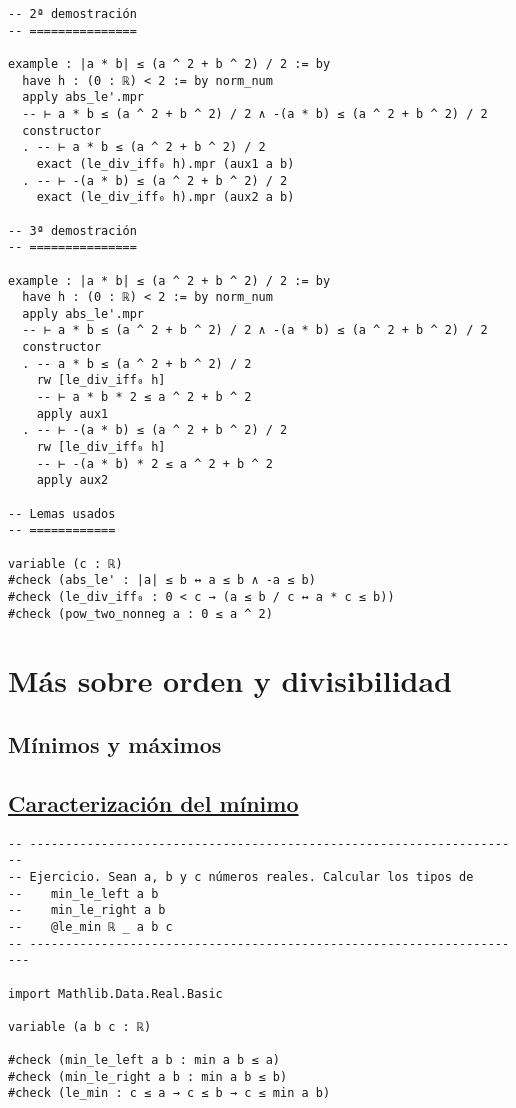 \begin{verbatim}
-- 2ª demostración
-- ===============

example : |a * b| ≤ (a ^ 2 + b ^ 2) / 2 := by
  have h : (0 : ℝ) < 2 := by norm_num
  apply abs_le'.mpr
  -- ⊢ a * b ≤ (a ^ 2 + b ^ 2) / 2 ∧ -(a * b) ≤ (a ^ 2 + b ^ 2) / 2
  constructor
  . -- ⊢ a * b ≤ (a ^ 2 + b ^ 2) / 2
    exact (le_div_iff₀ h).mpr (aux1 a b)
  . -- ⊢ -(a * b) ≤ (a ^ 2 + b ^ 2) / 2
    exact (le_div_iff₀ h).mpr (aux2 a b)

-- 3ª demostración
-- ===============

example : |a * b| ≤ (a ^ 2 + b ^ 2) / 2 := by
  have h : (0 : ℝ) < 2 := by norm_num
  apply abs_le'.mpr
  -- ⊢ a * b ≤ (a ^ 2 + b ^ 2) / 2 ∧ -(a * b) ≤ (a ^ 2 + b ^ 2) / 2
  constructor
  . -- a * b ≤ (a ^ 2 + b ^ 2) / 2
    rw [le_div_iff₀ h]
    -- ⊢ a * b * 2 ≤ a ^ 2 + b ^ 2
    apply aux1
  . -- ⊢ -(a * b) ≤ (a ^ 2 + b ^ 2) / 2
    rw [le_div_iff₀ h]
    -- ⊢ -(a * b) * 2 ≤ a ^ 2 + b ^ 2
    apply aux2

-- Lemas usados
-- ============

variable (c : ℝ)
#check (abs_le' : |a| ≤ b ↔ a ≤ b ∧ -a ≤ b)
#check (le_div_iff₀ : 0 < c → (a ≤ b / c ↔ a * c ≤ b))
#check (pow_two_nonneg a : 0 ≤ a ^ 2)
\end{verbatim}

\section{Más sobre orden y divisibilidad}
\label{sec:orgea8a7f8}

\subsection{Mínimos y máximos}
\label{sec:org8b47379}

\subsection{\href{./src/Basicos/Caracterizacion\_del\_minimo.lean}{Caracterización del mínimo}}
\label{sec:orgf97c818}
\begin{verbatim}
-- ---------------------------------------------------------------------
-- Ejercicio. Sean a, b y c números reales. Calcular los tipos de
--    min_le_left a b
--    min_le_right a b
--    @le_min ℝ _ a b c
-- ----------------------------------------------------------------------

import Mathlib.Data.Real.Basic

variable (a b c : ℝ)

#check (min_le_left a b : min a b ≤ a)
#check (min_le_right a b : min a b ≤ b)
#check (le_min : c ≤ a → c ≤ b → c ≤ min a b)
\end{verbatim}

